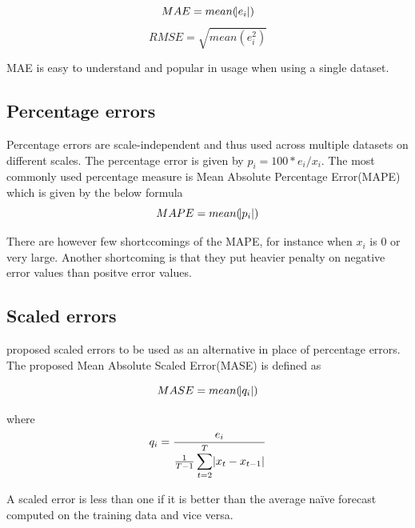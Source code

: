     \begin{equation}
        MAE = mean(\abs{e_{i}})
    \end{equation}
    \begin{equation}
        RMSE = \sqrt{mean(e^{2}_{i})}
    \end{equation}

MAE is easy to understand and popular in usage when using a single dataset.

\subsection{Percentage errors}
Percentage errors are scale-independent and thus used across multiple datasets on different
scales. The percentage error is given by $p_{i} = 100*e_{i}/x_{i}$. The most commonly used
percentage measure is Mean Absolute Percentage Error(MAPE) which is given by the below formula
    \begin{equation}
        MAPE = mean(\abs{p_{i}})
    \end{equation}

There are however few shortccomings of the MAPE, for instance when $x_{i}$ is 0 or very large.
Another shortcoming is that they put heavier penalty on negative error values than positve error
values.

\subsection{Scaled errors}
\citet{hyndman2006another} proposed scaled errors to be used as an alternative in place of
percentage errors. The proposed Mean Absolute Scaled Error(MASE) is defined as

    \begin{equation}
        MASE = mean(\abs{q_{i}})
    \end{equation}

where
    \begin{equation}
        q_{i} = \frac{e_{i}}{\frac{1}{T-1} \displaystyle\sum_{t=2}^{T}\abs{x_{t} - x_{t-1}}}
    \end{equation}

A scaled error is less than one if it is better than the average naïve forecast computed on the
training data and vice versa.

